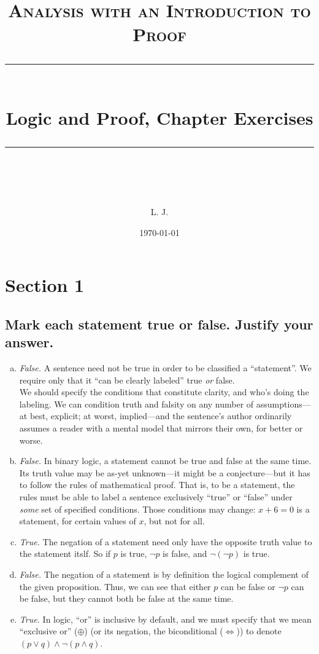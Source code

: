 \documentclass[12pt]{scrartcl} %
\title{	
	\normalfont\normalsize
	\textsc{Analysis with an Introduction to Proof}\\ %
	\vspace{25pt} %
	\rule{\linewidth}{0.5pt}\\ %
	\vspace{20pt} %
	{\huge Logic and Proof, Chapter Exercises}\\ %
	\vspace{12pt} %
	\rule{\linewidth}{2pt}\\ %
	\vspace{12pt} %
}
\author{\LARGE L. J.} %
\date{\normalsize\today} %
\begin{document}
\maketitle %

\section{Section 1}

\subsection{Mark each statement true or false. Justify your answer.}

\begin{enumerate}[(a)]
	\item \emph{False.} A sentence need not be true in order to be classified a ``statement''. We require only that it ``can be clearly labeled'' true \emph{or} false. \\ We should specify the conditions that constitute clarity, and who's doing the labeling. We can condition truth and falsity on any number of assumptions---at best, explicit; at worst, implied---and the sentence's author ordinarily assumes a reader with a mental model that mirrors their own, for better or worse.
	\item \emph{False.} In binary logic, a statement cannot be true and false at the same time. Its truth value may be as-yet unknown---it might be a conjecture---but it has to follow the rules of mathematical proof. That is, to be a statement, the rules must be able to label a sentence exclusively ``true'' or ``false'' under \emph{some} set of specified conditions. Those conditions may change: $ x + 6 = 0 $ is a statement, for certain values of $x$, but not for all.
	\item \emph{True.} The negation of a statement need only have the opposite truth value to the statement itslf. So if $p$ is true, $\neg p$ is false, and $\neg(\neg p)$ is true.
	\item \emph{False.} The negation of a statement is by definition the logical complement of the given proposition. Thus, we can see that either $p$ can be false or $\neg p$ can be false, but they cannot both be false at the same time.
	\item \emph{True.} In logic, ``or'' is inclusive by default, and we must specify that we mean ``exclusive or'' ($\oplus$) (or its negation, the biconditional ($\iff$)) to denote $(p \lor q) \land \neg(p \land q)$.
\end{enumerate}	
\end{document}
